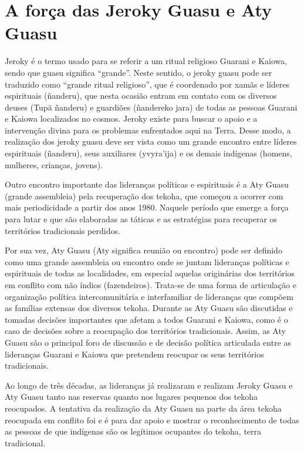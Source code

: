 \section{A força das Jeroky Guasu e Aty Guasu}

Jeroky é o termo usado para se referir a um ritual religioso Guarani e
Kaiowa, sendo que guasu significa ``grande''. Neste sentido, o jeroky
guasu pode ser traduzido como ``grande ritual religioso'', que é
coordenado por xamãs e líderes espirituais (ñanderu), que nesta ocasião
entram em contato com os diversos deuses (Tupã ñanderu) e guardiões
(ñandereko jara) de todas as pessoas Guarani e Kaiowa localizados no
cosmos. Jeroky existe para buscar o apoio e a intervenção divina para
os problemas enfrentados aqui na Terra. Desse modo, a realização dos
jeroky guasu deve ser vista como um grande encontro entre líderes
espirituais (ñanderu), seus auxiliares (yvyra’ija) e os demais
indígenas (homens, mulheres, crianças, jovens). 

Outro encontro importante das lideranças políticas e espirituais é a Aty
Guasu (grande assembleia) pela recuperação dos tekoha, que começou a
ocorrer com mais periodicidade a partir dos anos 1980.  Naquele período
que emerge a força para lutar e que são elaboradas as táticas e as
estratégias para recuperar os territórios tradicionais perdidos.

Por sua vez, Aty Guasu (Aty significa reunião ou encontro) pode ser
definido como uma grande assembleia ou encontro onde se juntam
lideranças políticas e espirituais de todas as localidades, em especial
aquelas originárias dos territórios em conflito com não índios
(fazendeiros). Trata-se de uma forma de articulação e organização
política intercomunitária e interfamiliar de lideranças que compõem as
famílias extensas dos diversos tekoha. Durante as Aty Guasu são
discutidas e tomadas decisões importantes que afetam a todos Guarani e
Kaiowa, como é o caso de decisões sobre a reocupação dos territórios
tradicionais. Assim, as Aty Guasu são o principal foro de discussão e
de decisão política articulada entre as lideranças Guarani e Kaiowa que
pretendem reocupar os seus territórios tradicionais. 

Ao longo de três décadas, as lideranças já realizaram e realizam Jeroky
Guasu e Aty Guasu tanto nas reservas quanto nos lugares pequenos dos
tekoha reocupados. A tentativa da realização da Aty Guasu na parte da
área tekoha reocupada em conflito foi e é para dar apoio e mostrar o
reconhecimento de todas as pessoas de que indígenas são os legítimos
ocupantes do tekoha, terra tradicional. 

